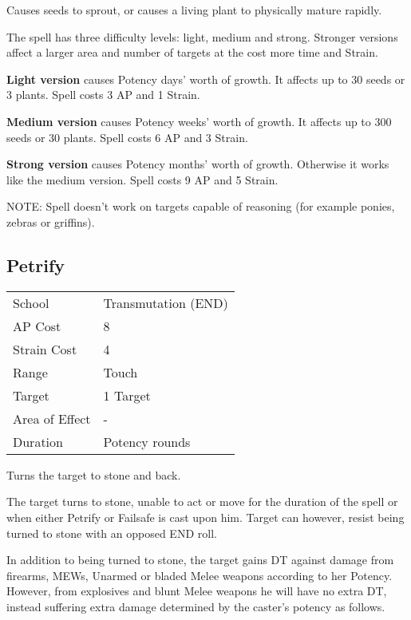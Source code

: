 \documentclass[11pt,a4paper,twocolumn]{book}
\begin{document}
\medskip

Causes seeds to sprout, or causes a living plant to physically mature rapidly.

The spell has three difficulty levels: light, medium and strong. Stronger versions affect a larger area and number of targets at the cost more time and Strain.

\textbf{Light version} causes Potency days' worth of growth. It affects up to 30 seeds or 3 plants. Spell costs 3 AP and 1 Strain.

\textbf{Medium version} causes Potency weeks' worth of growth. It affects up to 300 seeds or 30 plants. Spell costs 6 AP and 3 Strain.

\textbf{Strong version} causes Potency months' worth of growth. Otherwise it works like the medium version. Spell costs 9 AP and 5 Strain.

NOTE: Spell doesn't work on targets capable of reasoning (for example ponies, zebras or griffins).


\subsection*{Petrify}
{
	\begin{tabu} to 75mm{| X[l,4] | X[l,7] |}
		\hline
		School 			& Transmutation (END) 	\\
		AP Cost	      	& 8 					\\
		Strain Cost     & 4 					\\
		Range     		& Touch					\\
		Target      	& 1 Target				\\
		Area of Effect  & -  	 				\\
		Duration     	& Potency rounds		\\ \hline
	\end{tabu}
	
}

\medskip

Turns the target to stone and back.

The target turns to stone, unable to act or move for the duration of the spell or when either Petrify or Failsafe is cast upon him. Target can however, resist being turned to stone with an opposed END roll.

In addition to being turned to stone, the target gains DT against damage from firearms, MEWs, Unarmed or bladed Melee weapons according to her Potency. However, from explosives and blunt Melee weapons he will have no extra DT, instead suffering extra damage determined by the caster's potency as follows.
\end{document}
